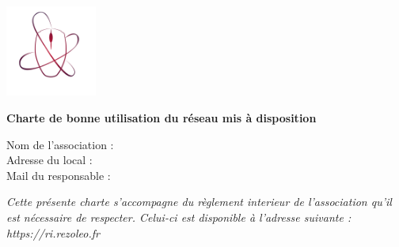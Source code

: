 \documentclass[11pt]{article}
\begin{document}
	
\thispagestyle{empty}

\begin{minipage}{0.15\linewidth}
	\includegraphics[height=3cm]{rezoleo.png}
\end{minipage}\hfill
\begin{minipage}{0.80\linewidth}\center
{\LARGE \textbf{Charte de bonne utilisation du réseau mis à disposition}}
\end{minipage}

\begin{flushright}
	\begin{minipage}{0.75\linewidth}
		Nom de l'association : \dotfill\\
		Adresse du local : \dotfill\\
		Mail du responsable : \dotfill
	\end{minipage}
\end{flushright}
\vspace*{0.5cm}

\textit{Cette présente charte s'accompagne du règlement interieur de l'association qu'il est nécessaire de respecter. Celui-ci est disponible à l'adresse suivante : https://ri.rezoleo.fr}
\end{document}
